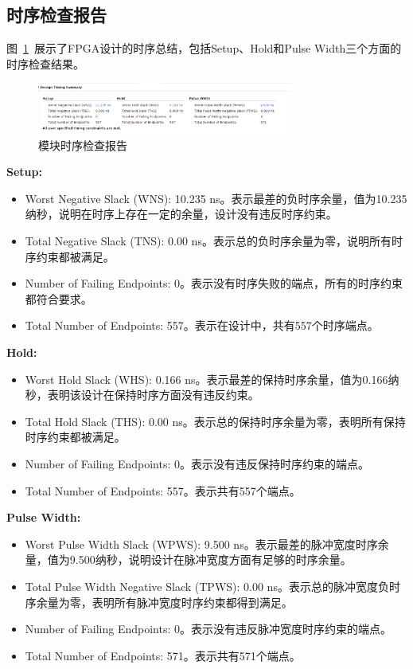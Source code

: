 \subsection{时序检查报告}

图~\ref{fig:exp5:timing}~展示了FPGA设计的时序总结，包括Setup、Hold和Pulse Width三个方面的时序检查结果。

\begin{figure}[htbp]
  \centering
  \includegraphics[width=0.75\textwidth]{figure/exp5/timing_summary.png}
  \caption{模块时序检查报告}
  \label{fig:exp5:timing}
\end{figure}


\textbf{Setup:}  
\begin{itemize}
  \item Worst Negative Slack (WNS): 10.235 ns。表示最差的负时序余量，值为10.235纳秒，说明在时序上存在一定的余量，设计没有违反时序约束。  
\item Total Negative Slack (TNS): 0.00 ns。表示总的负时序余量为零，说明所有时序约束都被满足。  
\item Number of Failing Endpoints: 0。表示没有时序失败的端点，所有的时序约束都符合要求。  
\item Total Number of Endpoints: 557。表示在设计中，共有557个时序端点。
\end{itemize}


\textbf{Hold:}  
\begin{itemize}
\item Worst Hold Slack (WHS): 0.166 ns。表示最差的保持时序余量，值为0.166纳秒，表明该设计在保持时序方面没有违反约束。  
\item Total Hold Slack (THS): 0.00 ns。表示总的保持时序余量为零，表明所有保持时序约束都被满足。  
\item Number of Failing Endpoints: 0。表示没有违反保持时序约束的端点。  
\item Total Number of Endpoints: 557。表示共有557个端点。
\end{itemize}

\textbf{Pulse Width:}  
\begin{itemize}
  \item Worst Pulse Width Slack (WPWS): 9.500 ns。表示最差的脉冲宽度时序余量，值为9.500纳秒，说明设计在脉冲宽度方面有足够的时序余量。  
  \item Total Pulse Width Negative Slack (TPWS): 0.00 ns。表示总的脉冲宽度负时序余量为零，表明所有脉冲宽度时序约束都得到满足。  
  \item Number of Failing Endpoints: 0。表示没有违反脉冲宽度时序约束的端点。  
\item Total Number of Endpoints: 571。表示共有571个端点。
\end{itemize}


